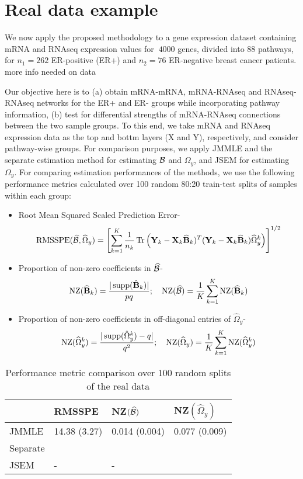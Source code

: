 \section{Real data example}
We now apply the proposed methodology to a gene expression dataset containing mRNA and RNAseq expression values for $~4000$ genes, divided into 88 pathways, for $n_1 = 262$ ER-positive (ER+) and $n_2 = 76$ ER-negative breast cancer patients. {\colrbf more info needed on data}

Our objective here is to (a) obtain mRNA-mRNA, mRNA-RNAseq and RNAseq-RNAseq networks for the ER+ and ER- groups while incorporating pathway information, (b) test for differential strengths of mRNA-RNAseq connections between the two sample groups. To this end, we take mRNA and RNAseq expression data as the top and bottm layers (X and Y), respectively, and consider pathway-wise groups. For comparison purposes, we apply JMMLE and the separate estimation method \citet{LinEtal16} for estimating ${\cal{B}}$ and $\Omega_y$, and JSEM for estimating $\Omega_y$. For comparing estimation performances of the methods, we use the following performance metrics calculated over 100 random 80:20 train-test splits of samples within each group:
%
\begin{itemize}
\item Root Mean Squared Scaled Prediction Error-
%
$$ \text{RMSSPE}(\widehat {{\cal{B}}}, \widehat \Omega_y) = \left[
\sum_{k=1}^K \frac{1}{n_k} \operatorname*{Tr} \left({\mathbf{Y}}_k - {\mathbf{X}}_k \widehat {{\mathbf{B}}}_k)^T ({\mathbf{Y}}_k - {\mathbf{X}}_k \widehat {{\mathbf{B}}}_k)
\widehat\Omega_y^k \right)
\right]^{1/2} $$

\item Proportion of non-zero coefficients in $\widehat {{\cal{B}}}$-
%
$$ \text{NZ}(\widehat {{\mathbf{B}}}_k) = \frac{| \operatorname*{supp}(\hat {{\mathbf{B}}}_k) |}{pq}; \quad
\text{NZ}(\widehat {{\cal{B}}}) = \frac{1}{K} \sum_{k=1}^K \text{NZ}(\widehat {{\mathbf{B}}}_k) $$

\item Proportion of non-zero coefficients in off-diagonal entries of $\widehat \Omega_y$-
%
$$ \text{NZ}(\widehat \Omega_y^k) = \frac{| \operatorname*{supp}(\hat \Omega_y^k) - q|}{q^2}; \quad
\text{NZ}(\widehat \Omega_y) = \frac{1}{K} \sum_{k=1}^K \text{NZ}(\widehat \Omega_y^k) $$
\end{itemize}

\begin{table}[t]
\centering
    \begin{tabular}{llll}
    \hline
~        & RMSSPE        & NZ$(\widehat {{\cal{B}}})$  & NZ$(\widehat \Omega_y)$  \\\hline
JMMLE    & 14.38 (3.27) & 0.014 (0.004) & 0.077 (0.009) \\
Separate & ~            & ~             & ~             \\
JSEM     & -            & -             & ~             \\\hline
    \end{tabular}
    \caption{Performance metric comparison over 100 random splits of the real data}
    \label{table:real-compare}
\end{table}

